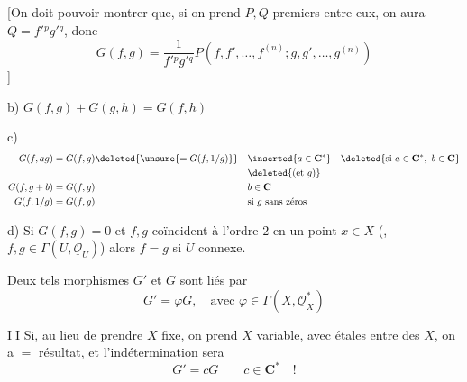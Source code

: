 [On doit pouvoir montrer que, si on prend $P,Q$
premiers entre eux, on aura 
$Q=f'{}^p g'{}^q$, donc
\[
G(f,g)=\frac{1}{f'{}^p g'{}^q}
P(f,f',\ldots,f^{(n)};g,g',\ldots,g^{(n)})
\]
]

b) $G(f,g)+G(g,h)=G(f,h)$

c)
\[
\begin{aligned}
G(f,ag)&=G(f,g)\deleted{\unsure{=G(f,1/g)}}
&&\inserted{a\in\mathbf{C}^{*}}\quad
\deleted{\text{si }a\in\mathbf{C}^{*},\ b\in\mathbf{C}}\\
&&&\deleted{(\text{et }g)}\\
G(f,g+b)&=G(f,g)&&b\in\mathbf{C}\\
G(f,1/g)&=G(f,g)&&\text{si }g\text{ sans zéros}
\end{aligned}
\]

d)  Si $G(f,g)=0$ et $f,g$ coïncident à l'ordre $2$
en un point $x\in X$ (, $f,g\in\Gamma(U,\underline{\mathcal{O}}_U)$)
alors $f=g$ si $U$ connexe.

Deux tels morphismes $G'$ et $G$ sont liés par
\[
G'=\varphi G,\quad\text{avec }\varphi\in\Gamma(X,\underline{\mathcal{O}}_X^{*})
\]




\textcircled{II} Si, au lieu de prendre $X$ fixe, on prend $X$ variable,
avec  étales entre des $X$, on a
$=$ résultat, et l'indétermination sera
\[
G'=cG\qquad c\in\mathbf{C}^{*}\quad !
\]

